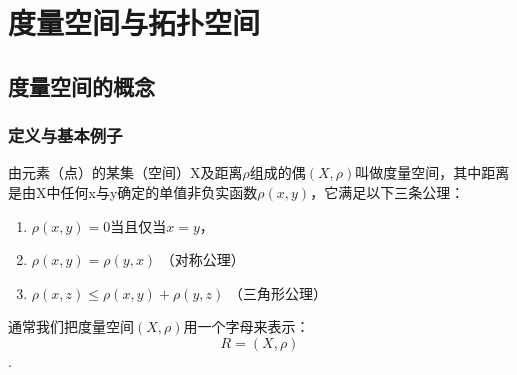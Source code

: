 \chapter{度量空间与拓扑空间}
\section{度量空间的概念}
\subsection{定义与基本例子}
\begin{definition}
	\label{duliangkongjian}
	由元素（点）的某集（空间）X及距离$\rho$组成的偶$(X,\rho)$叫做度量空间，其中距离是由X中任何x与y确定的单值非负实函数$\rho(x,y)$，它满足以下三条公理：
	\begin{enumerate}[1)]
		\item $\rho(x,y)=0$当且仅当$x=y$，
		\item $\rho(x,y)=\rho(y,x)$ （对称公理）
		\item $\rho(x,z)\leqslant\rho(x,y)+\rho(y,z)$ （三角形公理）
	\end{enumerate}
	通常我们把度量空间$(X,\rho)$用一个字母来表示：
	\[R=(X,\rho)\].
\end{definition}
